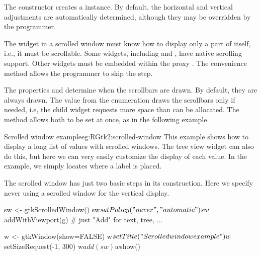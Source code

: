The constructor  creates a
 instance. By default, the horizontal and
vertical adjustments are automatically determined, although they may
be overridden by the programmer.

The widget in a scrolled window must know how to display only a part
of itself, i.e., it must be scrollable. Some widgets, including
 and , have native scrolling
support. Other widgets must be embedded within the proxy
. The  convenience method
 allows the programmer to
skip the  step.

The properties  and 
determine when the scrollbars are drawn. By default, they are always
drawn. The  value from the 
enumeration draws the scrollbars only if needed, i.e, the
child widget requests more space than can be allocated. The
 method allows both to be set at
once, as in the following example.

\begin{example}{Scrolled window example}{eg:RGtk2:scrolled-window}
This example shows how to display a long list of values with scrolled
windows. The tree view widget can also do this, but here we can very
easily customize the display of each value. In the example, we simply
locates where a label is placed.



\begin{Schunk}
\end{Schunk}

The scrolled window has just two basic steps in its construction. Here
we specify never using a scrolled window for the vertical display.
\begin{Schunk}
\begin{Sinput}
 sw <- gtkScrolledWindow()
 sw$setPolicy("never","automatic")
 sw$addWithViewport(g)          # just "Add" for text, tree, ...
\end{Sinput}
\end{Schunk}

\begin{Schunk}
\begin{Sinput}
 w <- gtkWindow(show=FALSE)
 w$setTitle("Scrolled window example")
 w$setSizeRequest(-1, 300)
 w$add(sw)
 w$show()
\end{Sinput}
\end{Schunk}
\end{example}

